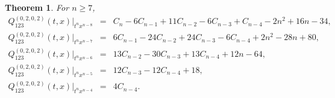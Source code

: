 \documentclass[
final,nomarks
]{dmtcs-episciences}
\newtheorem{theorem}{Theorem}
\newcommand{\Qm}[1]{Q_{123}^{(#1)}(t,x)}
\begin{document}
\begin{theorem}\label{theorem:18}For \begin{math}n\geq 7\end{math}, 
	\begin{eqnarray}
		\Qm{0,2,0,2}\big|_{t^n x^{n-8}}&=&C_n-6C_{n-1}+11C_{n-2}-6C_{n-3}+C_{n-4}-2n^2+16n-34,\\
		\Qm{0,2,0,2}\big|_{t^n x^{n-7}}&=&6C_{n-1}-24C_{n-2}+24C_{n-3}-6C_{n-4}+2n^2-28n+80,\\
		\Qm{0,2,0,2}\big|_{t^n x^{n-6}}&=&13C_{n-2}-30C_{n-3}+13C_{n-4}+12n-64,\\
		\Qm{0,2,0,2}\big|_{t^n x^{n-5}}&=&12C_{n-3}-12C_{n-4}+18,\\
		\Qm{0,2,0,2}\big|_{t^n x^{n-4}}&=&4C_{n-4}.
	\end{eqnarray}
\end{theorem}
\end{document}
